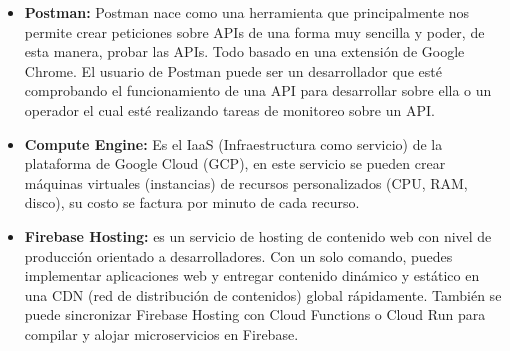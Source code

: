 \begin{itemize}
			\item \textbf{Postman:} Postman nace como una herramienta que principalmente nos permite crear peticiones sobre APIs de una forma muy sencilla y poder, de esta manera, probar las APIs. Todo basado en una extensión de Google Chrome. El usuario de Postman puede ser un desarrollador que esté comprobando el funcionamiento de una API para desarrollar sobre ella o un operador el cual esté realizando tareas de monitoreo sobre un API.
			
			\item  \textbf{Compute Engine:} Es el IaaS (Infraestructura como servicio) de la plataforma de Google Cloud (GCP), en este servicio se pueden crear máquinas virtuales (instancias) de recursos personalizados (CPU, RAM, disco), su costo se factura por minuto de cada recurso.
			\item \textbf{Firebase Hosting:} es un servicio de hosting de contenido web con nivel de producción orientado a desarrolladores. Con un solo comando, puedes implementar aplicaciones web y entregar contenido dinámico y estático en una CDN (red de distribución de contenidos) global rápidamente. También se puede sincronizar Firebase Hosting con Cloud Functions o Cloud Run para compilar y alojar microservicios en Firebase.
					
		\end{itemize}
